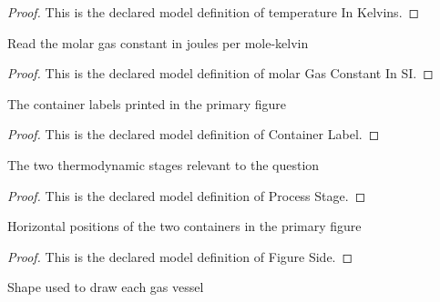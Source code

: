 \begin{proof}
  This is the declared model definition of temperature In Kelvins.
\end{proof}
\begin{definition}
  \label{def:physics:phyx-mini-0376:phyxminiproblems-problemphyxmini0376-molargasconstantinsi}
  Read the molar gas constant in joules per mole-kelvin
\end{definition}
\begin{proof}
  This is the declared model definition of molar Gas Constant In SI.
\end{proof}
\begin{definition}
  \label{def:physics:phyx-mini-0376:phyxminiproblems-problemphyxmini0376-containerlabel}
  The container labels printed in the primary figure
\end{definition}
\begin{proof}
  This is the declared model definition of Container Label.
\end{proof}
\begin{definition}
  \label{def:physics:phyx-mini-0376:phyxminiproblems-problemphyxmini0376-processstage}
  The two thermodynamic stages relevant to the question
\end{definition}
\begin{proof}
  This is the declared model definition of Process Stage.
\end{proof}
\begin{definition}
  \label{def:physics:phyx-mini-0376:phyxminiproblems-problemphyxmini0376-figureside}
  Horizontal positions of the two containers in the primary figure
\end{definition}
\begin{proof}
  This is the declared model definition of Figure Side.
\end{proof}
\begin{definition}
  \label{def:physics:phyx-mini-0376:phyxminiproblems-problemphyxmini0376-containershape}
  Shape used to draw each gas vessel
\end{definition}
